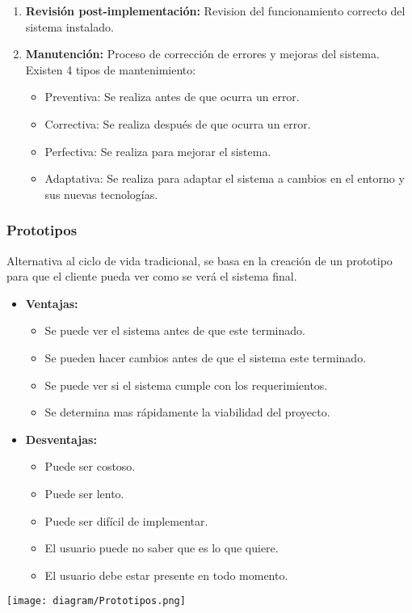 \documentclass{templateNote}
\begin{document}
\begin{enumerate}
    \item \textbf{Revisión post-implementación:} Revision del funcionamiento correcto del sistema instalado.
    
    \item \textbf{Manutención:} Proceso de corrección de errores y mejoras del sistema. Existen 4 tipos de mantenimiento:
    \begin{itemize}
        \item Preventiva: Se realiza antes de que ocurra un error.
        \item Correctiva: Se realiza después de que ocurra un error.
        \item Perfectiva: Se realiza para mejorar el sistema.
        \item Adaptativa: Se realiza para adaptar el sistema a cambios en el entorno y sus nuevas tecnologías.
    \end{itemize}
\end{enumerate}

\newpage
\subsubsection*{Prototipos}
\noindent Alternativa al ciclo de vida tradicional, se basa en la creación de un prototipo para que el cliente pueda ver como se verá el sistema final.
\begin{itemize}
    \item \textbf{Ventajas:}
    \begin{itemize}
        \item Se puede ver el sistema antes de que este terminado.
        \item Se pueden hacer cambios antes de que el sistema este terminado.
        \item Se puede ver si el sistema cumple con los requerimientos.
        \item Se determina mas rápidamente la viabilidad del proyecto.
    \end{itemize}
    \item \textbf{Desventajas:}
    \begin{itemize}
        \item Puede ser costoso.
        \item Puede ser lento.
        \item Puede ser difícil de implementar.
        \item El usuario puede no saber que es lo que quiere.
        \item El usuario debe estar presente en todo momento.
    \end{itemize}
\end{itemize}
\begin{center}
    \texttt{[image: diagram/Prototipos.png]}
\end{center}
\end{document}
